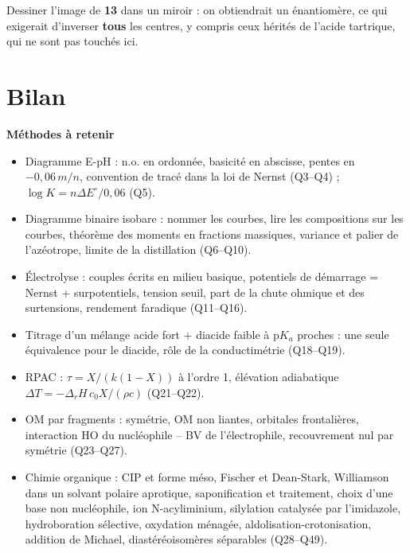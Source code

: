 \documentclass[11pt,a4paper]{article}
\providecommand{\tightlist}{\setlength{\itemsep}{0pt}\setlength{\parskip}{0pt}}
\begin{document}
\begin{piege}

Dessiner l'image de \textbf{13} dans un miroir : on obtiendrait un énantiomère, ce qui exigerait d'inverser \textbf{tous} les centres, y compris ceux hérités de l'acide tartrique, qui ne sont pas touchés ici.

\end{piege}

\hypertarget{bilan}{%
\section{Bilan}\label{bilan}}

\textbf{Méthodes à retenir}

\begin{itemize}
\tightlist
\item
  Diagramme E-pH : n.o. en ordonnée, basicité en abscisse, pentes en \(-0{,}06\,m/n\), convention de tracé dans la loi de Nernst (Q3--Q4) ; \(\log K=n\Delta E^\circ/0{,}06\) (Q5).
\item
  Diagramme binaire isobare : nommer les courbes, lire les compositions sur les courbes, théorème des moments en fractions massiques, variance et palier de l'azéotrope, limite de la distillation (Q6--Q10).
\item
  Électrolyse : couples écrits en milieu basique, potentiels de démarrage = Nernst + surpotentiels, tension seuil, part de la chute ohmique et des surtensions, rendement faradique (Q11--Q16).
\item
  Titrage d'un mélange acide fort + diacide faible à p\(K_a\) proches : une seule équivalence pour le diacide, rôle de la conductimétrie (Q18--Q19).
\item
  RPAC : \(\tau=X/(k(1-X))\) à l'ordre 1, élévation adiabatique \(\Delta T=-\Delta_rH\,c_0X/(\rho c)\) (Q21--Q22).
\item
  OM par fragments : symétrie, OM non liantes, orbitales frontalières, interaction HO du nucléophile -- BV de l'électrophile, recouvrement nul par symétrie (Q23--Q27).
\item
  Chimie organique : CIP et forme méso, Fischer et Dean-Stark, Williamson dans un solvant polaire aprotique, saponification et traitement, choix d'une base non nucléophile, ion N-acyliminium, silylation catalysée par l'imidazole, hydroboration sélective, oxydation ménagée, aldolisation-\allowbreak{}crotonisation, addition de Michael, diastéréoisomères séparables (Q28--Q49).
\end{itemize}
\end{document}
